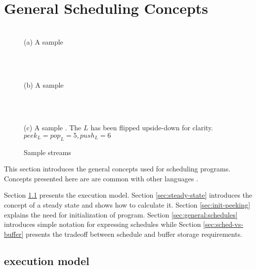 \section{General {\StreamIt} Scheduling Concepts}
\label{chpt:sched-basic}

\begin{figure}
\begin{center}

\begin{minipage}{1.2in}
\centering {} \\
{\protect\small (a) A sample {\pipeline}}
\end{minipage}
~
\begin{minipage}{1.2in}
\centering {} \\
{\protect\small (b) A sample {\splitjoin}}
\end{minipage}
~
\begin{minipage}{1.5in}
\centering {} \\
{\protect\small (c) A sample {{\feedbackloop}}.  The $L$ {\filter}
has been flipped upside-down for clarity.\\$peek_L = pop_L = 5,
push_L = 6$}
\end{minipage}

\caption{Sample {\StreamIt} streams} \label{fig:steady-state}

\end{center}
\end{figure}

This section introduces the general concepts used for scheduling
{\StreamIt} programs.  Concepts presented here are are common with
other languages \cite{ptolemyoverview} \cite{esterel92}
\cite{lustre}.

Section \ref{sec:exec-model} presents the {\StreamIt} execution
model. Section \ref{sec:steady-state} introduces the concept of a
steady state and shows how to calculate it. Section
\ref{sec:init-peeking} explains the need for initialization of
{\StreamIt} program. Section \ref{sec:general:schedules} introduces
simple notation for expressing schedules while Section
\ref{sec:sched-vs-buffer} presents the tradeoff between schedule
and buffer storage requirements.

\subsection{{\StreamIt} execution model}
\label{sec:exec-model}

